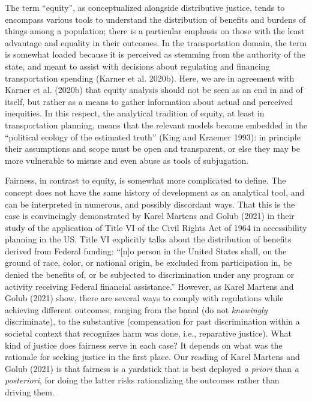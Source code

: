 \documentclass[12pt, oneside]{report}
\begin{document}
The term ``equity'', as conceptualized alongside distributive justice,
tends to encompass various tools to understand the distribution of
benefits and burdens of things among a population; there is a particular
emphasis on those with the least advantage and equality in their
outcomes. In the transportation domain, the term is somewhat loaded
because it is perceived as stemming from the authority of the state, and
meant to assist with decisions about regulating and financing
transportation spending (Karner et al. 2020b). Here, we are in agreement
with Karner et al. (2020b) that equity analysis should not be seen as an
end in and of itself, but rather as a means to gather information about
actual and perceived inequities. In this respect, the analytical
tradition of equity, at least in transportation planning, means that the
relevant models become embedded in the ``political ecology of the
estimated truth'' (King and Kraemer 1993): in principle their
assumptions and scope must be open and transparent, or else they may be
more vulnerable to misuse and even abuse as tools of subjugation.

Fairness, in contrast to equity, is somewhat more complicated to define.
The concept does not have the same history of development as an
analytical tool, and can be interpreted in numerous, and possibly
discordant ways. That this is the case is convincingly demonstrated by
Karel Martens and Golub (2021) in their study of the application of
Title VI of the Civil Rights Act of 1964 in accessibility planning in
the US. Title VI explicitly talks about the distribution of benefits
derived from Federal funding: ``{[}n{]}o person in the United States
shall, on the ground of race, color, or national origin, be excluded
from participation in, be denied the benefits of, or be subjected to
discrimination under any program or activity receiving Federal financial
assistance.'' However, as Karel Martens and Golub (2021) show, there are
several ways to comply with regulations while achieving different
outcomes, ranging from the banal (do not \emph{knowingly} discriminate),
to the substantive (compensation for past discrimination within a
societal context that recognizes harm was done, i.e., reparative
justice). What kind of justice does fairness serve in each case? It
depends on what was the rationale for seeking justice in the first
place. Our reading of Karel Martens and Golub (2021) is that fairness is
a yardstick that is best deployed \emph{a priori} than \emph{a
posteriori}, for doing the latter risks rationalizing the outcomes
rather than driving them.
\end{document}
